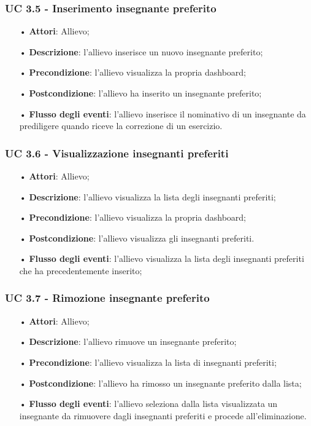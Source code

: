 \subsubsection{UC 3.5 - Inserimento insegnante preferito}
\begin{itemize}
\item[•]\textbf{Attori}: Allievo;
\item[•]\textbf{Descrizione}: l'allievo inserisce un nuovo insegnante preferito;
\item[•]\textbf{Precondizione}: l'allievo visualizza la propria dashboard;
\item[•]\textbf{Postcondizione}: l'allievo ha inserito un insegnante preferito;
\item[•]\textbf{Flusso degli eventi}: l'allievo inserisce il nominativo di un insegnante da prediligere quando riceve la correzione di un esercizio.
\end{itemize}

\subsubsection{UC 3.6 - Visualizzazione insegnanti preferiti}
\begin{itemize}
	\item[•]\textbf{Attori}: Allievo;
	\item[•]\textbf{Descrizione}: l'allievo visualizza la lista degli insegnanti preferiti;
	\item[•]\textbf{Precondizione}: l'allievo visualizza la propria dashboard;
	\item[•]\textbf{Postcondizione}: l'allievo visualizza gli insegnanti preferiti.
	\item[•]\textbf{Flusso degli eventi}: l'allievo visualizza la lista degli insegnanti preferiti che ha precedentemente inserito;
\end{itemize}

\subsubsection{UC 3.7 - Rimozione insegnante preferito}
\begin{itemize}
	\item[•]\textbf{Attori}: Allievo;
	\item[•]\textbf{Descrizione}: l'allievo rimuove un insegnante preferito;
	\item[•]\textbf{Precondizione}: l'allievo visualizza la lista di insegnanti preferiti;
	\item[•]\textbf{Postcondizione}: l'allievo ha rimosso un insegnante preferito dalla lista;
	\item[•]\textbf{Flusso degli eventi}: l'allievo seleziona dalla lista visualizzata un insegnante da rimuovere dagli insegnanti preferiti e procede all'eliminazione.
\end{itemize}

